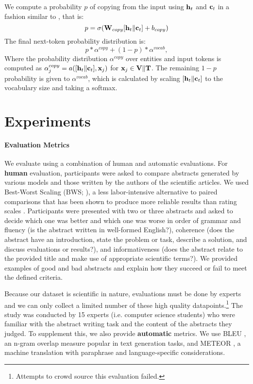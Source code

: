 \documentclass[11pt,a4paper]{article}
\begin{document}
 We compute a probability $p$ of copying from the input using ${\bf h}_t$ and ${\bf c}_t$ in a fashion similar to \citet{see2017get}, that is:
 \begin{equation}
     p = \sigma ( \mathbf{W}_{copy} [{\bf h}_t\|{\bf c}_t] + b_{copy} )
 \end{equation}
 The final next-token probability distribution is:
\begin{equation}
p * \alpha^{copy} + (1-p) * \alpha^{vocab}, 
\end{equation}
Where the probability distribution $\alpha^{copy}$ over entities and input tokens is computed as $\alpha^{copy}_j = a([{\bf h}_t\|{\bf c}_t],\mathbf{x}_j)$ for ${\bf x}_j \in {\bf V}\|{\bf T}$.
 The remaining $1-p$ probability is given to $\alpha^{vocab}$, which is calculated by scaling $[{\bf h}_t\|{\bf c}_t]$ to the vocabulary size and taking a softmax. 


\section{Experiments}

\paragraph{Evaluation Metrics} \label{sec:eval}
We evaluate using a combination of human and automatic evaluations. 
For \textbf{human} evaluation, participants were asked to compare abstracts generated by various models and those written by the authors of the scientific articles. 
We used Best-Worst Scaling (BWS; \cite{louviere1991best,louviere2015best}), a less labor-intensive alternative to paired comparisons that has been shown to produce more reliable results than rating scales \cite{Kiritchenko2016CapturingRF}.
Participants were presented with two or three abstracts and asked to decide which one was better and which one was worse in order of grammar and fluency (is the abstract written in well-formed English?), coherence (does the abstract have an introduction, state the problem or task, describe a solution, and discuss evaluations or results?), and informativeness (does the abstract relate to the provided title and make use of appropriate scientific terms?).
We provided examples of good and bad abstracts and explain how they succeed or fail to meet the defined criteria. 


Because our dataset is scientific in nature, evaluations must be done by experts and we can only collect a limited number of these high quality datapoints.\footnote{Attempts to crowd source this evaluation failed.}
The study was conducted by 15 experts (i.e. computer science students) who were familiar with the abstract writing task and the content of the abstracts they judged. 
To supplement this, we also provide \textbf{automatic} metrics. 
We use BLEU \cite{Papineni2002BleuAM}, an n-gram overlap measure popular in text generation tasks, and METEOR \cite{Denkowski2014MeteorUL}, a machine translation with paraphrase and language-specific considerations.
\end{document}
